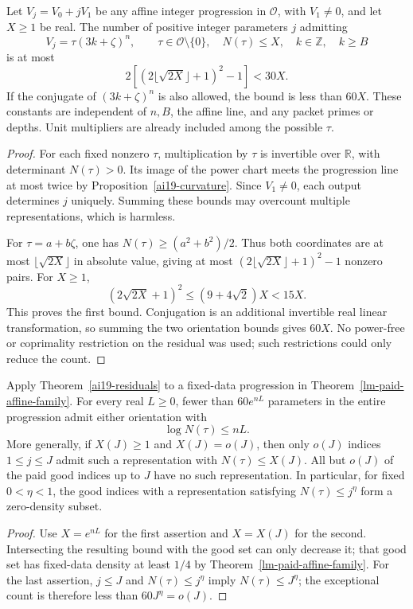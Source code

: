 \begin{theorem}
\label{ai19-residuals}
Let \(V_j=V_0+jV_1\) be any affine integer progression in
\(\mathcal O\), with \(V_1\ne0\), and let \(X\ge1\) be real.
The number of positive integer parameters \(j\) admitting
\[
 V_j=\tau(3k+\zeta)^n,\qquad
 \tau\in\mathcal O\setminus\{0\},\quad N(\tau)\le X,\quad
 k\in\mathbb Z,\quad k\ge B
\]
is at most
\[
 2\left[\left(2\lfloor\sqrt{2X}\rfloor+1\right)^2-1\right]
 <30X.
\]
If the conjugate of \((3k+\zeta)^n\) is also allowed, the bound is
less than \(60X\). These constants are independent of \(n,B\),
the affine line, and any packet primes or depths. Unit multipliers
are already included among the possible \(\tau\).
\end{theorem}
\begin{proof}
For each fixed nonzero \(\tau\), multiplication by \(\tau\) is
invertible over \(\mathbb R\), with determinant \(N(\tau)>0\).
Its image of the power chart meets the progression line at most
twice by Proposition~\ref{ai19-curvature}. Since \(V_1\ne0\),
each output determines \(j\) uniquely. Summing these bounds may
overcount multiple representations, which is harmless.

For \(\tau=a+b\zeta\), one has
\(N(\tau)\ge(a^2+b^2)/2\). Thus both coordinates are at most
\(\lfloor\sqrt{2X}\rfloor\) in absolute value, giving at most
\((2\lfloor\sqrt{2X}\rfloor+1)^2-1\) nonzero pairs. For \(X\ge1\),
\[
 (2\sqrt{2X}+1)^2
 \le(9+4\sqrt2)X<15X.
\]
This proves the first bound. Conjugation is an additional invertible
real linear transformation, so summing the two orientation bounds
gives \(60X\). No power-free or coprimality restriction on the
residual was used; such restrictions could only reduce the count.
\end{proof}

\begin{corollary}
\label{ai19-transfer}
Apply Theorem~\ref{ai19-residuals} to a fixed-data progression in
Theorem~\ref{lm-paid-affine-family}. For every real \(L\ge0\), fewer
than \(60e^{nL}\) parameters in the entire progression admit either
orientation with
\[
 \log N(\tau)\le nL.
\]
More generally, if \(X(J)\ge1\) and \(X(J)=o(J)\), then only \(o(J)\)
indices \(1\le j\le J\) admit such a representation with
\(N(\tau)\le X(J)\). All but \(o(J)\) of the paid good indices
up to \(J\) have no such representation. In particular, for fixed
\(0<\eta<1\), the good indices with a representation satisfying
\(N(\tau)\le j^\eta\) form a zero-density subset.
\end{corollary}
\begin{proof}
Use \(X=e^{nL}\) for the first assertion and \(X=X(J)\) for the
second. Intersecting the resulting bound with the good set can
only decrease it; that good set has fixed-data density at least
\(1/4\) by Theorem~\ref{lm-paid-affine-family}. For the last assertion,
\(j\le J\) and \(N(\tau)\le j^\eta\) imply \(N(\tau)\le J^\eta\);
the exceptional count is therefore less than \(60J^\eta=o(J)\).
\end{proof}

